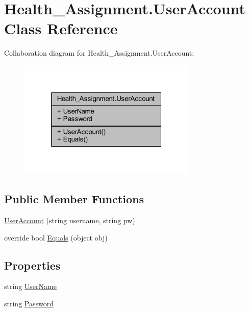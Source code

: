 \hypertarget{class_health___assignment_1_1_user_account}{}\section{Health\+\_\+\+Assignment.\+User\+Account Class Reference}
\label{class_health___assignment_1_1_user_account}


Collaboration diagram for Health\+\_\+\+Assignment.\+User\+Account\+:\nopagebreak
\begin{figure}[H]
\begin{center}
\leavevmode
\includegraphics[width=241pt]{class_health___assignment_1_1_user_account__coll__graph}
\end{center}
\end{figure}
\subsection*{Public Member Functions}
\begin{DoxyCompactItemize}
\item 
\hyperlink{class_health___assignment_1_1_user_account_aef940a85977d399f298493f90432e29e}{User\+Account} (string username, string pw)
\item 
override bool \hyperlink{class_health___assignment_1_1_user_account_ac4b01e6dca71bad58b0f77807efb761b}{Equals} (object obj)
\end{DoxyCompactItemize}
\subsection*{Properties}
\begin{DoxyCompactItemize}
\item 
string \hyperlink{class_health___assignment_1_1_user_account_acd2746c798cd476ae7c7be4dee111229}{User\+Name}
\item 
string \hyperlink{class_health___assignment_1_1_user_account_a7039f9c4dd63d2858031df8595726a35}{Password}
\end{DoxyCompactItemize}


